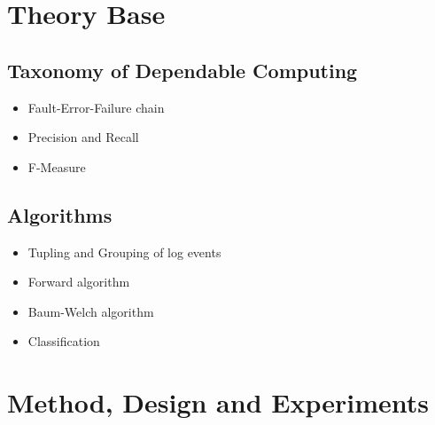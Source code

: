 \documentclass[12pt]{article} %
\begin{document}

\section{Theory Base} %


\subsection{Taxonomy of Dependable Computing} %
\begin{itemize} %
    \item Fault-Error-Failure chain \cite{IEEE04_Avizienis}
    \item Precision and Recall \cite{rijsbergen79}
    \item F-Measure \cite{DARPA99_Makhoul}
\end{itemize} 


\subsection{Algorithms} %
\begin{itemize} %
    \item Tupling and Grouping of log events
    \item Forward algorithm
    \item Baum-Welch algorithm
    \item Classification
\end{itemize} 


\section{Method, Design and Experiments} %
\end{document}
